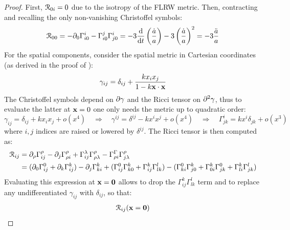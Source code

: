 \begin{proofbox}
  \begin{proof}
    First, $ \EuScript{R}_{0i} = 0 $ due to the isotropy of the FLRW metric. Then, contracting  and recalling the only non-vanishing Christoffel symbols:
    \begin{equation*}
      \EuScript{R}_{00} = - \partial_0 \Gamma^i_{i0} - \Gamma^j_{i0} \Gamma^i_{j0} = - 3 \frac{\mathrm{d}}{\mathrm{d} t} \left( \frac{\dot{a}}{a} \right) - 3 \left( \frac{\dot{a}}{a} \right)^2 = - 3 \frac{\ddot{a}}{a}
    \end{equation*}
    For the spatial components, consider the spatial metric in Cartesian coordinates (as derived in the proof of ):
    \begin{equation*}
      \gamma_{ij} = \delta_{ij} + \frac{k x_i x_j}{1 - k \mathbf{x} \cdot \mathbf{x}}
    \end{equation*}
    The Christoffel symbols depend on $ \partial \gamma $ and the Ricci tensor on $ \partial^2 \gamma $, thus to evaluate the latter at $ \mathbf{x} = 0 $ one only needs the metric up to quadratic order:
    \begin{equation*}
      \gamma_{ij} = \delta_{ij} + k x_i x_j + o(x^4)
      \quad \Rightarrow \quad
      \gamma^{ij} = \delta^{ij} - k x^i x^j + o(x^4)
      \quad \Rightarrow \quad
      \Gamma^i_{jk} = k x^i \delta_{jk} + o(x^3)
    \end{equation*}
    where $ i,j $ indices are raised or lowered by $ \delta^{ij} $. The Ricci tensor is then computed as:
    \begin{equation*}
      \begin{split}
        \EuScript{R}_{ij}
        &= \partial_\rho \Gamma^\rho_{ij} - \partial_j \Gamma^\rho_{\rho i} + \Gamma^\lambda_{ij} \Gamma^\rho_{\rho \lambda} - \Gamma^\Gamma_{\rho i} \Gamma^\rho_{j \lambda} \\
        &= (\partial_0 \Gamma^0_{ij} + \partial_k \Gamma^k_{ij}) - \partial_j \Gamma^k_{ki} + (\Gamma^0_{ij} \Gamma^k_{k0} + \Gamma^k_{ij} \Gamma^l_{lk}) - (\Gamma^0_{ki} \Gamma^k_{j0} + \Gamma^k_{0i} \Gamma^0_{jk} + \Gamma^k_{li} \Gamma^l_{jk})
      \end{split}
    \end{equation*}
    Evaluating this expression at $ \mathbf{x} = \mathbf{0} $ allows to drop the $ \Gamma^k_{ij} \Gamma^l_{lk} $ term and to replace any undifferentiated $ \gamma_{ij} $ with $ \delta_{ij} $, so that:
    \begin{equation*}
      \begin{split}
        \rr_{ij} (\ve{x} = \ve{0})

\end{split}
\end{equation*}
\end{proof}
\end{proofbox}
